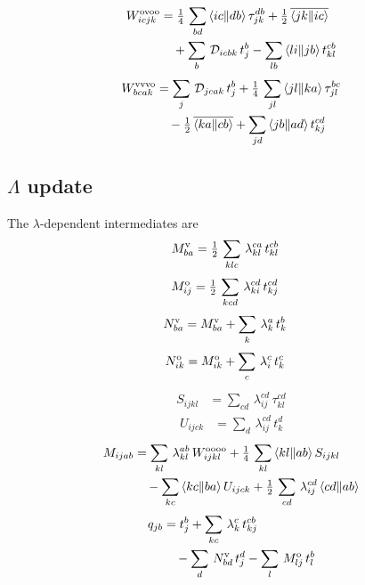 \documentclass[11pt]{article}
\newcommand{\anti}[4]{\langle #1#2\Vert #3#4\rangle}
\begin{document}
\begin{align*}
  W^{\rm ovoo}_{icjk} &= \tfrac{1}{4}\, \sum_{bd}\,\anti{i}{c}{d}{b}\,\tau_{jk}^{db} + \tfrac{1}{2}\, \overline{\anti{j}{k}{i}{c}} \notag\\
  & \quad +  \sum_{b}\,\mathcal D_{icbk}\,t_{j}^{b} -  \sum_{lb}\,\anti{l}{i}{j}{b}\,t_{kl}^{cb}
\end{align*}
\begin{align*}
  W^{\rm vvvo}_{bcak} &=  \sum_{j}\,\mathcal D_{jcak}\,t_{j}^{b} + \tfrac{1}{4}\, \sum_{jl}\,\anti{j}{l}{k}{a}\,\tau_{jl}^{bc} \notag\\
  & \quad - \tfrac{1}{2}\, \overline{\anti{k}{a}{c}{b}} +  \sum_{jd}\,\anti{j}{b}{a}{d}\,t_{kj}^{cd}
\end{align*}

\subsection{$\Lambda$ update}

The $\lambda$-dependent intermediates are
\begin{align*}
  M^{\rm v}_{ba} &= \tfrac{1}{2}\, \sum_{klc}\,\lambda_{kl}^{ca}\,t_{kl}^{cb}
\end{align*}
\begin{align*}
  M^{\rm o}_{ij} &= \tfrac{1}{2}\, \sum_{kcd}\,\lambda_{ki}^{cd}\,t_{kj}^{cd}
\end{align*}
\begin{align*}
  N^{\rm v}_{ba} &=  M^{\rm v}_{ba} +  \sum_{k}\,\lambda_{k}^{a}\,t_{k}^{b}
\end{align*}
\begin{align*}
  N^{\rm o}_{ik} &=  M^{\rm o}_{ik} +  \sum_{c}\,\lambda_{i}^{c}\,t_{k}^{c}
\end{align*}
\begin{align*}
  S_{ijkl} &=  \sum_{cd}\,\lambda_{ij}^{cd}\,\tau_{kl}^{cd}
\end{align*}
\begin{align*}
  U_{ijck} &=  \sum_{d}\,\lambda_{ij}^{cd}\,t_{k}^{d}
\end{align*}
\begin{align*}
  M_{ijab} &=  \sum_{kl}\,\lambda_{kl}^{ab}\,W^{\rm oooo}_{ijkl} + \tfrac{1}{4}\, \sum_{kl}\,\anti{k}{l}{a}{b}\,S_{ijkl} \notag\\
  & \quad -  \sum_{kc}\,\anti{k}{c}{b}{a}\,U_{ijck} + \tfrac{1}{2}\, \sum_{cd}\,\lambda_{ij}^{cd}\,\anti{c}{d}{a}{b}
\end{align*}
\begin{align*}
  q_{jb} &=  t_{j}^{b} +  \sum_{kc}\,\lambda_{k}^{c}\,t_{kj}^{cb} \notag\\
  & \quad -  \sum_{d}\,N^{\rm v}_{bd}\,t_{j}^{d} -  \sum_{l}\,M^{\rm o}_{lj}\,t_{l}^{b}
\end{align*}
\end{document}
